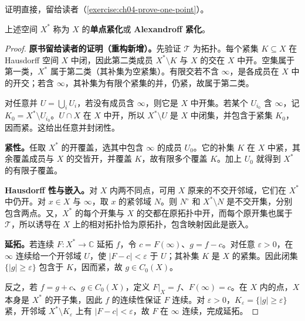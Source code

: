 \documentclass[../../main.tex]{subfiles}%
\begin{document}
证明直接，留给读者（\cref{exercise:ch04-prove-one-point}）。
\begin{definition}[单点紧化]\label{definition:ch04-one-point-compactification}
上述空间 $X^*$ 称为 $X$ 的\textbf{单点紧化}或 \textbf{Alexandroff 紧化}。
\end{definition}
\begin{proof}
\textbf{原书留给读者的证明（重构新增）。}先验证 $\mathcal T$ 为拓扑。每个紧集 $K\subseteq X$ 在 Hausdorff 空间 $X$ 中闭，因此第二类成员 $X^*\setminus K$ 与 $X$ 的交在 $X$ 中开。空集属于第一类，$X^*$ 属于第二类（其补集为空紧集）。有限交若不含 $\infty$，是各成员在 $X$ 中的开交；若含 $\infty$，其补集为有限个紧集的并，仍紧，故属于第二类。

对任意并 $U=\bigcup_iU_i$，若没有成员含 $\infty$，则它是 $X$ 中开集。若某个 $U_{i_0}$ 含 $\infty$，记 $K_0=X^*\setminus U_{i_0}$。$U\cap X$ 在 $X$ 中开，所以 $X^*\setminus U$ 是 $X$ 中闭集，并包含于紧集 $K_0$，因而紧。这给出任意并封闭性。

\textbf{紧性。}任取 $X^*$ 的开覆盖，选其中包含 $\infty$ 的成员 $U_0$。它的补集 $K$ 在 $X$ 中紧，其余覆盖成员与 $X$ 的交皆开，并覆盖 $K$，故有限多个覆盖 $K$。加上 $U_0$ 就得到 $X^*$ 的有限子覆盖。

\textbf{Hausdorff 性与嵌入。}对 $X$ 内两不同点，可用 $X$ 原来的不交开邻域，它们在 $X^*$ 中仍开。对 $x\in X$ 与 $\infty$，取 $x$ 的紧邻域 $N$。则 $N^\circ$ 和 $X^*\setminus N$ 是不交开集，分别包含两点。又，$X^*$ 的每个开集与 $X$ 的交都在原拓扑中开，而每个原开集也属于 $\mathcal T$，所以诱导在 $X$ 上的相对拓扑恰为原拓扑，包含映射因此是嵌入。

\textbf{延拓。}若连续 $F:X^*\to\mathbb C$ 延拓 $f$，令 $c=F(\infty)$、$g=f-c$。对任意 $\varepsilon>0$，在 $\infty$ 连续给一个开邻域 $U$，使 $|F-c|<\varepsilon$ 于 $U$；其补集 $K$ 是 $X$ 的紧集。因此闭集 $\{|g|\ge\varepsilon\}$ 包含于 $K$，因而紧，故 $g\in C_0(X)$。

反之，若 $f=g+c$、$g\in C_0(X)$，定义 $F|_X=f$、$F(\infty)=c$。在 $X$ 内的点，$X$ 本身是 $X^*$ 的开子集，因此 $f$ 的连续性保证 $F$ 连续。对 $\varepsilon>0$，$K_\varepsilon=\{|g|\ge\varepsilon\}$ 紧，开邻域 $X^*\setminus K_\varepsilon$ 上有 $|F-c|<\varepsilon$，故 $F$ 在 $\infty$ 连续，完成延拓。
\end{proof}
\end{document}
